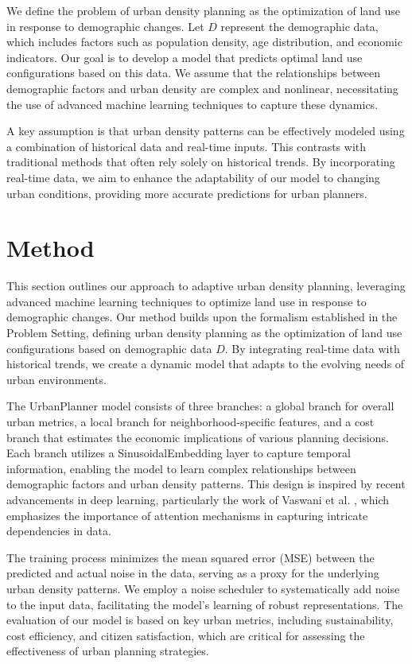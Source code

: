 \documentclass{article} %
\begin{document}
We define the problem of urban density planning as the optimization of land use in response to demographic changes. Let \( D \) represent the demographic data, which includes factors such as population density, age distribution, and economic indicators. Our goal is to develop a model that predicts optimal land use configurations based on this data. We assume that the relationships between demographic factors and urban density are complex and nonlinear, necessitating the use of advanced machine learning techniques to capture these dynamics.

A key assumption is that urban density patterns can be effectively modeled using a combination of historical data and real-time inputs. This contrasts with traditional methods that often rely solely on historical trends. By incorporating real-time data, we aim to enhance the adaptability of our model to changing urban conditions, providing more accurate predictions for urban planners.

\section{Method}
\label{sec:method}

This section outlines our approach to adaptive urban density planning, leveraging advanced machine learning techniques to optimize land use in response to demographic changes. Our method builds upon the formalism established in the Problem Setting, defining urban density planning as the optimization of land use configurations based on demographic data \( D \). By integrating real-time data with historical trends, we create a dynamic model that adapts to the evolving needs of urban environments.

The UrbanPlanner model consists of three branches: a global branch for overall urban metrics, a local branch for neighborhood-specific features, and a cost branch that estimates the economic implications of various planning decisions. Each branch utilizes a SinusoidalEmbedding layer to capture temporal information, enabling the model to learn complex relationships between demographic factors and urban density patterns. This design is inspired by recent advancements in deep learning, particularly the work of Vaswani et al. \citep{vaswani2017attention}, which emphasizes the importance of attention mechanisms in capturing intricate dependencies in data.

The training process minimizes the mean squared error (MSE) between the predicted and actual noise in the data, serving as a proxy for the underlying urban density patterns. We employ a noise scheduler to systematically add noise to the input data, facilitating the model's learning of robust representations. The evaluation of our model is based on key urban metrics, including sustainability, cost efficiency, and citizen satisfaction, which are critical for assessing the effectiveness of urban planning strategies.
\end{document}
